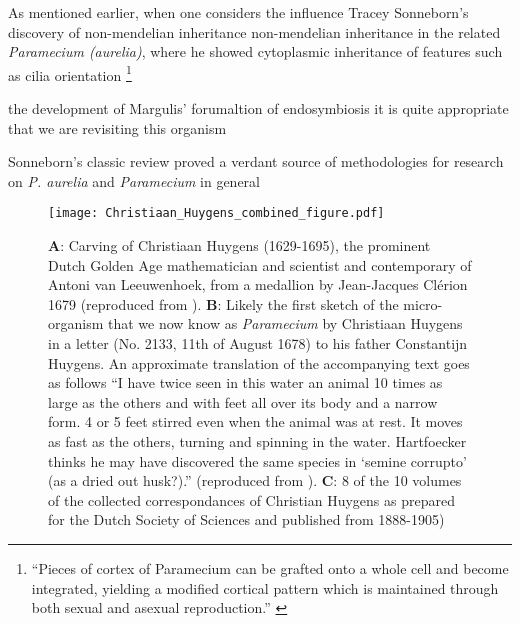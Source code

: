 \citep{Corliss1974} 


As mentioned earlier, when one considers the influence Tracey Sonneborn's discovery of non-mendelian
inheritance non-mendelian inheritance in the related \textit{Paramecium (aurelia)}, where he showed
cytoplasmic inheritance of features such as cilia orientation \footnote{``Pieces of cortex of Paramecium can be grafted onto a whole cell and
    become integrated, yielding a modified cortical pattern which is maintained through both sexual and asexual reproduction.'' \citep{Beisson1965}}

the development of Margulis' forumaltion of endosymbiosis \citep{Margulis1998} it is
quite appropriate that we are revisiting this organism

Sonneborn's classic review \citep{Sonneborn1950} proved a verdant source of methodologies
for research on  \textit{P. aurelia} and \textit{Paramecium} in general






\begin{figure}[h!]
    \caption{\textbf{A}: Carving of Christiaan Huygens (1629-1695), the prominent Dutch Golden Age mathematician and scientist and contemporary of Antoni van Leeuwenhoek, from a medallion by Jean-Jacques Cl\'erion 1679 (reproduced from \citep{Huygens}). \textbf{B}: Likely the first sketch of the micro-organism that we now know as \textit{Paramecium} by Christiaan Huygens in a letter (No. 2133, 11th of August 1678) to his father Constantijn Huygens. An approximate translation of the accompanying text goes as follows ``I have twice seen in this water an animal 10 times as large as the others and with feet all over its body and a narrow form. 4 or 5 feet stirred even when the animal was at rest. It moves as fast as the others, turning and spinning in the water. Hartfoecker thinks he may have discovered the same species in `semine corrupto' (as a dried out husk?).'' (reproduced from \citep{Huygens}). \textbf{C}: 8 of the 10 volumes of the collected correspondances of Christian Huygens as prepared for the Dutch Society of Sciences and published from 1888-1905)}
\texttt{[image: Christiaan\_Huygens\_combined\_figure.pdf]}
\end{figure}







